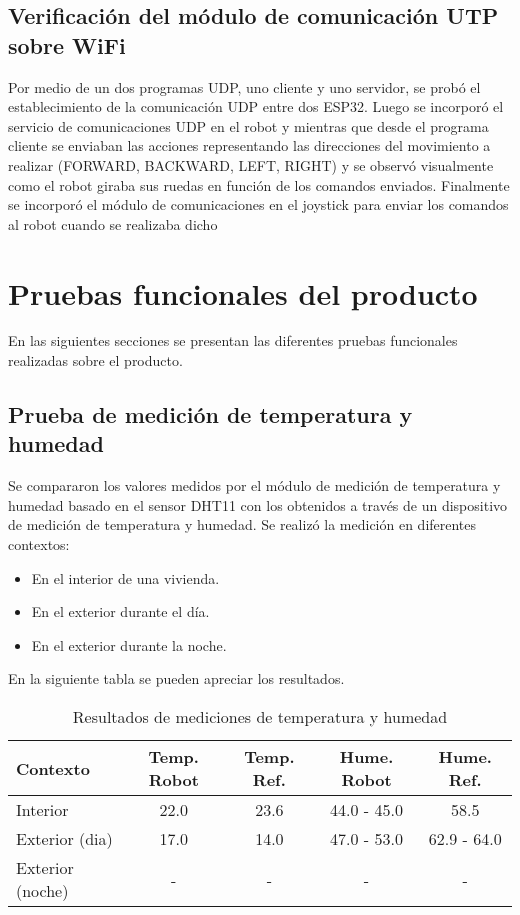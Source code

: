 \subsection{Verificación del módulo de comunicación UTP sobre WiFi}
Por medio de un dos programas UDP, uno cliente y uno servidor, se probó el establecimiento de la comunicación UDP entre dos ESP32. Luego se incorporó el servicio de comunicaciones UDP en el robot y mientras que desde el programa cliente se enviaban las acciones representando las direcciones del movimiento a realizar (FORWARD, BACKWARD, LEFT, RIGHT) y se observó visualmente como el robot giraba sus ruedas en función de los comandos enviados. Finalmente se incorporó el módulo de comunicaciones en el joystick para enviar los comandos al robot cuando se realizaba dicho


\section{Pruebas funcionales del producto}

En las siguientes secciones se presentan las diferentes pruebas funcionales realizadas sobre el producto.


\subsection{Prueba de medición de temperatura y humedad}

Se compararon los valores medidos por el módulo de medición de temperatura y humedad basado en el sensor DHT11 con los obtenidos a través de un dispositivo de medición de temperatura y humedad. Se realizó la medición en diferentes contextos:

\begin{itemize}
	\item En el interior de una vivienda.
	\item En el exterior durante el día.
	\item En el exterior durante la noche.
\end{itemize}

En la siguiente tabla se pueden apreciar los resultados.

\begin{table}[h]
\centering
\caption[Resultados de mediciones de temperatura y humedad]{Resultados de mediciones de temperatura y humedad}
\begin{tabular}{l c c c c}
\toprule
\textbf{Contexto} & \textbf{Temp. Robot} & \textbf{Temp. Ref.} & \textbf{Hume. Robot}  & \textbf{Hume. Ref.}\\
\midrule
Interior & 22.0 & 23.6 & 44.0 - 45.0 & 58.5 \\
Exterior (dia) & 17.0  & 14.0 & 47.0 - 53.0 & 62.9 - 64.0 \\
Exterior (noche) & - & - & - & - \\
\bottomrule
\hline
\end{tabular}
\end{table}

